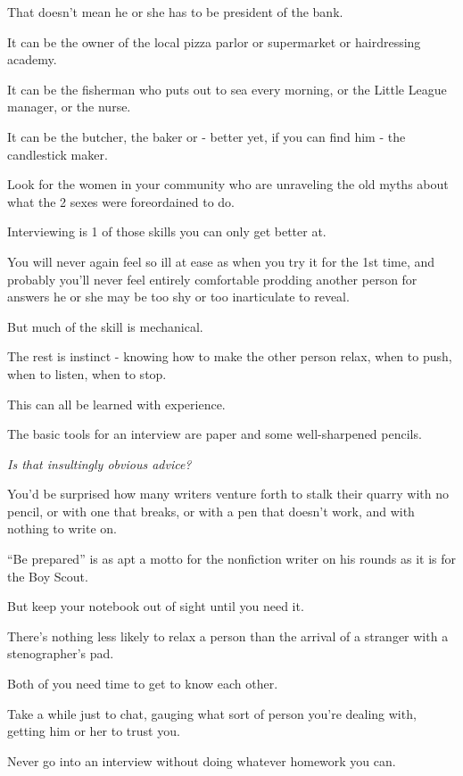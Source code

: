 \documentclass{book}
\numberwithin{equation}{section}
\begin{document}
That doesn't mean he or she has to be president of the bank.

It can be the owner of the local pizza parlor or supermarket or hairdressing academy.

It can be the fisherman who puts out to sea every morning, or the Little League manager, or the nurse.

It can be the butcher, the baker or - better yet, if you can find him - the candlestick maker.

Look for the women in your community who are unraveling the old myths about what the 2 sexes were foreordained to do.


%
Interviewing is 1 of those skills you can only get better at.

You will never again feel so ill at ease as when you try it for the 1st time, and probably you'll never feel entirely comfortable prodding another person for answers he or she may be too shy or too inarticulate to reveal.

But much of the skill is mechanical.

The rest is instinct - knowing how to make the other person relax, when to push, when to listen, when to stop.

This can all be learned with experience.

The basic tools for an interview are paper and some well-sharpened pencils.

\textit{Is that insultingly obvious advice?}

You'd be surprised how many writers venture forth to stalk their quarry with no pencil, or with one that breaks, or with a pen that doesn't work, and with nothing to write on.

``Be prepared'' is as apt a motto for the nonfiction writer on his rounds as it is for the Boy Scout.

But keep your notebook out of sight until you need it.

There's nothing less likely to relax a person than the arrival of a stranger with a stenographer's pad.

Both of you need time to get to know each other.

Take a while just to chat, gauging what sort of person you're dealing with, getting him or her to trust you.

%
Never go into an interview without doing whatever homework you can.
\end{document}

